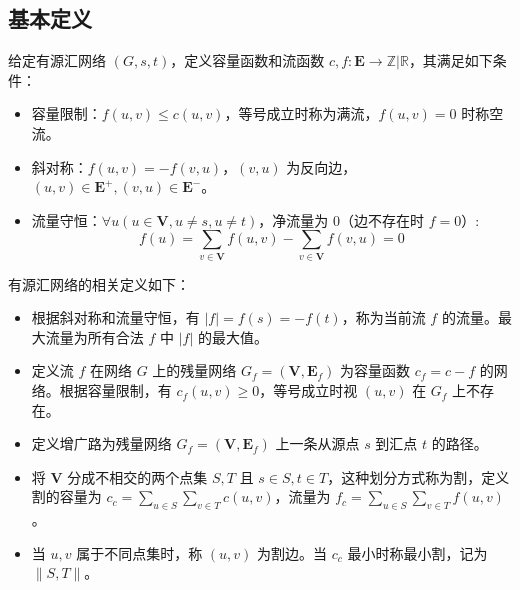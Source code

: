 \documentclass[12pt,a4paper]{article}
\begin{document}
\subsection{基本定义}
给定有源汇网络 $(G,s,t)$，定义容量函数和流函数 $c,f:\mathbf{E}\rightarrow\mathbb{Z}|\mathbb{R}$，其满足如下条件：
\begin{itemize}
	\item 容量限制：$f(u,v)\le c(u,v)$，等号成立时称为满流，$f(u,v)=0$ 时称空流。
	\item 斜对称：$f(u,v)=-f(v,u)$，$(v,u)$ 为反向边，$(u,v)\in\mathbf{E}^+,(v,u)\in\mathbf{E}^-$。
	\item 流量守恒：$\displaystyle\forall u(u\in \mathbf{V},u\ne s,u\ne t)$，净流量为 $0$（边不存在时 $f=0$）:
	\begin{equation*}
		f(u)=\sum_{v\in\mathbf{V}}f(u,v)-\sum_{v\in\mathbf{V}}f(v,u)=0
	\end{equation*}
\end{itemize}
有源汇网络的相关定义如下：
\begin{itemize}
	\item 根据斜对称和流量守恒，有 $|f|=f(s)=-f(t)$，称为当前流 $f$ 的流量。最大流量为所有合法 $f$ 中 $|f|$ 的最大值。
	\item 定义流 $f$ 在网络 $G$ 上的残量网络 $G_f=(\mathbf{V},\mathbf{E}_f)$ 为容量函数 $c_f=c-f$ 的网络。根据容量限制，有 $c_f(u,v)\ge0$，等号成立时视 $(u,v)$ 在 $G_f$ 上不存在。
	\item 定义增广路为残量网络 $G_f=(\mathbf{V},\mathbf{E}_f)$ 上一条从源点 $s$ 到汇点 $t$ 的路径。
	\item 将 $\mathbf{V}$ 分成不相交的两个点集 $S,T$ 且 $s\in S, t\in T$，这种划分方式称为割，定义割的容量为 $\displaystyle c_c=\sum_{u\in S}\sum_{v\in T}c(u,v)$，流量为 $\displaystyle f_c=\sum_{u\in S}\sum_{v\in T}f(u,v)$。
	\item 当 $u,v$ 属于不同点集时，称 $(u,v)$ 为割边。当 $c_c$ 最小时称最小割，记为 $\|S,T\|$。
\end{itemize}
\end{document}
